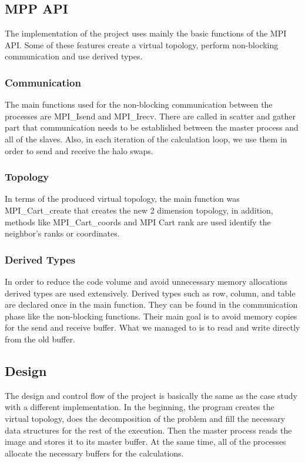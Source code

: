 \documentclass[12pt,a4paper]{article}
\begin{document}
    \subsection{MPP API}
    The implementation of the project uses mainly the basic functions of the MPI API. Some of these features create a virtual topology, perform non-blocking communication and use derived types.

        \subsubsection{Communication}
        The main functions used for the non-blocking communication between the processes are MPI\_Isend and MPI\_Irecv. There are called in scatter and gather part that communication needs to be established between the master process and all of the slaves. Also, in each iteration of the calculation loop, we use them in order to send and receive the halo swaps.

        \subsubsection{Topology}
        In terms of the produced virtual topology, the main function was MPI\_Cart\_create that creates the new 2 dimension topology, in addition, methods like MPI\_Cart\_coords and MPI Cart rank are used identify the neighbor's ranks or coordinates.

        \subsubsection{Derived Types}
        In order to reduce the code volume and avoid unnecessary memory allocations derived types are used extensively. Derived types such as row, column, and table are declared once in the main function. They can be found in the communication phase like the non-blocking functions. Their main goal is to avoid memory copies for the send and receive buffer. What we managed to is to read and write directly from the old buffer.

    \subsection{Design}
    The design and control flow of the project is basically the same as the case study with a different implementation. In the beginning, the program creates the virtual topology, does the decomposition of the problem and fill the necessary data structures for the rest of the execution. Then the master process reads the image and stores it to its master buffer. At the same time, all of the processes allocate the necessary buffers for the calculations.
\end{document}
